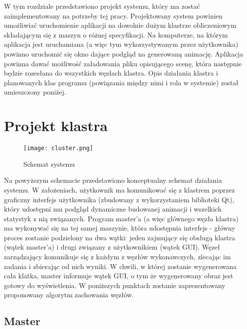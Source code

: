 W tym rozdziale przedstawiono projekt systemu, który ma zostać zaimplementowany na potrzeby tej pracy. Projektowany system powinien umożliwiać uruchomienie aplikacji na dowolnie dużym klastrze obliczeniowym składającym się z maszyn o różnej specyfikacji. Na komputerze, na którym aplikacja jest uruchamiana (a więc tym wykorzystywanym przez użytkownika) powinno uruchomić się okno dające podgląd na generowaną animację. Aplikacja powinna dawać możliwość załadowania pliku opisującego scenę, która następnie będzie rozesłana do wszystkich węzłach klastra. Opis działania klastra i planowanych klas programu (powiązania między nimi i rola w systemie) został umieszczony poniżej. 

\section{Projekt klastra}

\begin{figure}[h!]
\centering
  \caption{Schemat systemu}
  \texttt{[image: cluster.png]}
\end{figure}

Na powyższym schemacie przedstawiono konceptualny schemat działania systemu. W założeniach, użytkownik ma komunikować się z klastrem poprzez graficzny interfejs użytkownika (zbudowany z wykorzystaniem biblioteki Qt), który udostępni mu podgląd dynamiczne budowanej animacji i wszelkich statystyk z nią związanych. Program master'a (a więc głównego węzła klastra) ma wykonywać się na tej samej maszynie, która udostępnia interfejs - główny proces zostanie podzielony na dwa wątki: jeden zajmujący się obsługą klastra (wątek master'a) i drugi związany z użytkownikiem (wątek GUI). Węzeł zarządzający komunikuje się z każdym z węzłów wykonawczych, zlecając im zadania i zbierając od nich wyniki. W chwili, w której zostanie wygenerowana cała klatka, master informuje wątek GUI, o tym że wygenerowany obraz jest gotowy do wyświetlenia. W poniższych punktach zostanie zaprezentowany proponowany algorytm zachowania węzłów.  
	
\subsection{Master}

